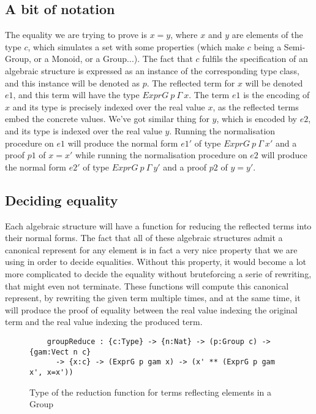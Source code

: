 	\subsection {A bit of notation}
The equality we are trying to prove is $x=y$, where $x$ and $y$ are elements of the type $c$, which  simulates a set with some properties (which make $c$ being a Semi-Group, or a Monoid, or a Group...). The fact that $c$ fulfils the specification of an algebraic structure is expressed as an instance of the corresponding type class, and this instance will be denoted as $p$.
The reflected term for $x$ will be denoted $e1$, and this term will have the type $ExprG\ p\ \Gamma\ x$. The term $e1$ is the encoding of $x$ and its type is precisely indexed over the real value $x$, as the reflected terms embed the concrete values.
We've got similar thing for $y$, which is encoded by $e2$, and its type is indexed over the real value $y$.
Running the normalisation procedure on $e1$ will produce the normal form $e1'$ of type $ExprG\ p\ \Gamma\ x'$ and a proof $p1$ of $x=x'$ while running the normalisation procedure on $e2$ will produce the normal form $e2'$ of type $ExprG\ p\ \Gamma\ y'$ and a proof $p2$ of $y=y'$.

	\subsection {Deciding equality}
	
Each algebraic structure will have a function for reducing the reflected terms into their normal forms. The fact that all of these algebraic structures admit a canonical represent for any element is in fact a very nice property that we are using in order to decide equalities. Without this property, it would become a lot more complicated to decide the equality without bruteforcing a serie of rewriting, that might even not terminate.
These functions will compute this canonical represent, by rewriting the given term multiple times, and at the same time, it will produce the proof of equality between the real value indexing the original term and the real value indexing the produced term.

\begin{figure}[H]
\figrule
\begin{center}
\begin{verbatim}
	groupReduce : {c:Type} -> {n:Nat} -> (p:Group c) -> {gam:Vect n c} 
	  -> {x:c} -> (ExprG p gam x) -> (x' ** (ExprG p gam x', x=x'))
\end{verbatim}
\end{center}
\caption{Type of the reduction function for terms reflecting elements in a Group}
\figrule
\end{figure}

